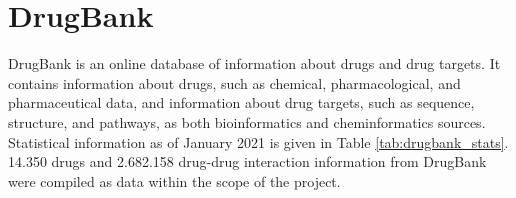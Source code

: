 \section{DrugBank}
DrugBank \cite{wishart2006drugbank, wishart2008drugbank, wishart2018drugbank} is an online database of information about drugs and drug targets. It contains information about drugs, such as chemical, pharmacological, and pharmaceutical data, and information about drug targets, such as sequence, structure, and pathways, as both bioinformatics and cheminformatics sources. Statistical information as of January 2021 is given in Table 
\ref{tab:drugbank_stats}. 14.350 drugs and 2.682.158 drug-drug interaction information from DrugBank were compiled as data within the scope of the project.

